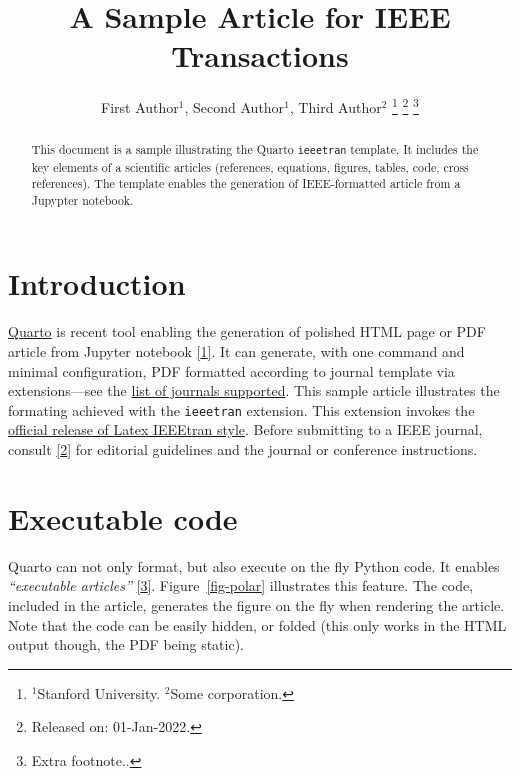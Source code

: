 \documentclass[letterpaper, 10 pt, journal, twoside]{IEEEtran}
\newcommand\muted[1]{%
\bgroup
\hskip0pt\color{black!40!}%
#1%
\egroup
}
\begin{document}
\author{
        First Author\(^1\),     Second
Author\(^1\),     Third Author\(^2\)
    \thanks{\(^1\)Stanford University. \(^2\)Some corporation.}
    \thanks{Released on: 01-Jan-2022.}
    \thanks{Extra footnote..}
}


\title{A Sample Article for IEEE Transactions}
\maketitle

\begin{abstract}
    This document is a sample illustrating the Quarto \texttt{ieeetran}
    template. It includes the key elements of a scientific articles
    (references, equations, figures, tables, code, cross references).
    The template enables the generation of IEEE-formatted article from a
    Jupypter notebook.
\end{abstract}

\hypertarget{sec-intro}{%
\section{Introduction}\label{sec-intro}}

\href{https://quarto.org/}{Quarto} is recent tool enabling the
generation of polished HTML page or PDF article from Jupyter notebook
\protect\hyperlink{ref-Close2022-dt}{{[}1{]}}. It can generate, with one
command and minimal configuration, PDF formatted according to journal
template via extensions---see the
\href{https://github.com/quarto-journals/}{list of journals supported}.
This sample article illustrates the formating achieved with the
\texttt{ieeetran} extension. This extension invokes the
\href{https://www.ctan.org/tex-archive/macros/latex/contrib/IEEEtran/}{official
release of Latex IEEEtran style}. Before submitting to a IEEE journal,
consult \protect\hyperlink{ref-Ieee2020-zv}{{[}2{]}} for editorial
guidelines and the journal or conference instructions.

\muted{\lipsum[1-2]}

\hypertarget{executable-code}{%
\section{Executable code}\label{executable-code}}

Quarto can not only format, but also execute on the fly Python code. It
enables \emph{``executable articles''}
\protect\hyperlink{ref-Lasser2020-wo}{{[}3{]}}. Figure~\ref{fig-polar}
illustrates this feature. The code, included in the article, generates
the figure on the fly when rendering the article. Note that the code can
be easily hidden, or folded (this only works in the HTML output though,
the PDF being static).
\end{document}

